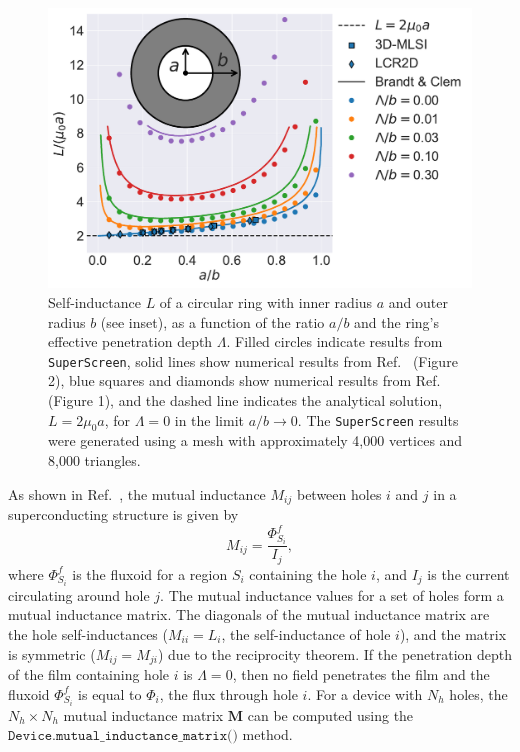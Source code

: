 \documentclass[final,3p,times,twocolumn]{elsarticle}
\newcommand{\inline}[1]{\texttt{#1}\xspace}
\newcommand{\SuperScreen}{\inline{SuperScreen}}
\begin{document}
\begin{figure}
    \centering
    \includegraphics[width=\linewidth]{examples/images/inductance.pdf}
    \caption{Self-inductance $L$ of a circular ring with inner radius $a$ and outer radius $b$ (see inset), as a function of the ratio $a / b$ and the ring's effective penetration depth $\Lambda$. Filled circles indicate results from \SuperScreen, solid lines show numerical results from Ref.~\cite{Brandt2004-ew} (Figure 2), blue squares and diamonds show numerical results from Ref.~\cite{Khapaev1997-kw} (Figure 1), and the dashed line indicates the analytical solution, $L = 2\mu_0 a$, for $\Lambda=0$ in the limit $a/b\to 0$\cite{Ketchen2012-mb, Babaei_Brojeny2003-la}. The \SuperScreen results were generated using a mesh with approximately 4,000 vertices and 8,000 triangles.}
    \label{fig:inductance}
\end{figure}

As shown in Ref.~\cite{Brandt2005-wj}, the mutual inductance $M_{ij}$ between holes $i$ and $j$ in a superconducting structure is given by
\begin{equation}
    M_{ij}=\frac{\Phi^f_{S_i}}{I_j},
\end{equation}
where $\Phi^f_{S_i}$ is the fluxoid for a region $S_i$ containing the hole $i$, and $I_j$ is the current circulating around hole $j$. The mutual inductance values for a set of holes form a mutual inductance matrix. The diagonals of the mutual inductance matrix are the hole self-inductances ($M_{ii}=L_i$, the self-inductance of hole $i$), and the matrix is symmetric ($M_{ij}=M_{ji}$) due to the reciprocity theorem. If the penetration depth of the film containing hole $i$ is $\Lambda = 0$, then no field penetrates the film and the fluxoid $\Phi^f_{S_i}$ is equal to $\Phi_i$, the flux through hole $i$. For a device with $N_h$ holes, the $N_h\times N_h$ mutual inductance matrix $\mathbf{M}$ can be computed using the $\inline{Device.mutual_inductance_matrix()}$ method.
\end{document}
